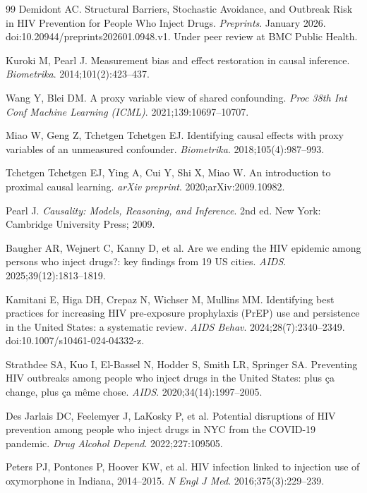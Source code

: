 \documentclass[12pt]{article}
\begin{document}
\begin{thebibliography}{99}
 Demidont AC. Structural Barriers, Stochastic Avoidance, and Outbreak Risk in HIV Prevention for People Who Inject Drugs. \emph{Preprints}. January 2026. doi:10.20944/preprints202601.0948.v1. Under peer review at BMC Public Health.

 Kuroki M, Pearl J. Measurement bias and effect restoration in causal inference. \textit{Biometrika}. 2014;101(2):423--437.

 Wang Y, Blei DM. A proxy variable view of shared confounding. \textit{Proc 38th Int Conf Machine Learning (ICML)}. 2021;139:10697--10707.

 Miao W, Geng Z, Tchetgen Tchetgen EJ. Identifying causal effects with proxy variables of an unmeasured confounder. \textit{Biometrika}. 2018;105(4):987--993.

 Tchetgen Tchetgen EJ, Ying A, Cui Y, Shi X, Miao W. An introduction to proximal causal learning. \textit{arXiv preprint}. 2020;arXiv:2009.10982.

 Pearl J. \textit{Causality: Models, Reasoning, and Inference}. 2nd ed. New York: Cambridge University Press; 2009.

 Baugher AR, Wejnert C, Kanny D, et al. Are we ending the HIV epidemic among persons who inject drugs?: key findings from 19 US cities. \textit{AIDS}. 2025;39(12):1813--1819.

 Kamitani E, Higa DH, Crepaz N, Wichser M, Mullins MM. Identifying best practices for increasing HIV pre-exposure prophylaxis (PrEP) use and persistence in the United States: a systematic review. \textit{AIDS Behav}. 2024;28(7):2340--2349. doi:10.1007/s10461-024-04332-z.

 Strathdee SA, Kuo I, El-Bassel N, Hodder S, Smith LR, Springer SA. Preventing HIV outbreaks among people who inject drugs in the United States: plus ça change, plus ça même chose. \textit{AIDS}. 2020;34(14):1997--2005.

 Des Jarlais DC, Feelemyer J, LaKosky P, et al. Potential disruptions of HIV prevention among people who inject drugs in NYC from the COVID-19 pandemic. \textit{Drug Alcohol Depend}. 2022;227:109505.

 Peters PJ, Pontones P, Hoover KW, et al. HIV infection linked to injection use of oxymorphone in Indiana, 2014--2015. \textit{N Engl J Med}. 2016;375(3):229--239.


\end{thebibliography}
\end{document}
